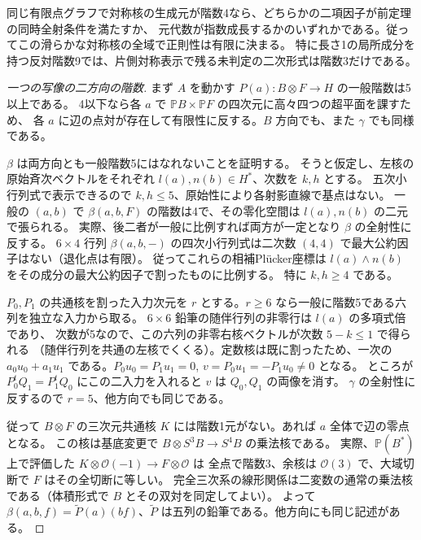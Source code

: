 \begin{theorem}\label{thm:smooth-symmetric-kernel-all}
同じ有限点グラフで対称核の生成元が階数4なら、どちらかの二項因子が前定理の同時全射条件を満たすか、
元代数が指数成長するかのいずれかである。従ってこの滑らかな対称核の全域で正則性は有限に決まる。
特に長さ1の局所成分を持つ反対階数9では、片側対称表示で残る未判定の二次形式は階数3だけである。
\end{theorem}
\begin{proof}[一つの写像の二方向の階数]
まず $A$ を動かす $P(a):B\otimes F\to H$ の一般階数は5以上である。
4以下なら各 $a$ で $\mathbb P B\times\mathbb P F$ の四次元に高々四つの超平面を課すため、
各 $a$ に辺の点対が存在して有限性に反する。$B$ 方向でも、また $\gamma$ でも同様である。

$\beta$ は両方向とも一般階数5にはなれないことを証明する。
そうと仮定し、左核の原始斉次ベクトルをそれぞれ $l(a),n(b)\in H^*$、次数を $k,h$ とする。
五次小行列式で表示できるので $k,h\le5$、原始性により各射影直線で基点はない。
一般の $(a,b)$ で $\beta(a,b,F)$ の階数は4で、その零化空間は $l(a),n(b)$ の二元で張られる。
実際、後二者が一般に比例すれば両方が一定となり $\beta$ の全射性に反する。
$6\times4$ 行列 $\beta(a,b,-)$ の四次小行列式は二次数 $(4,4)$ で最大公約因子はない（退化点は有限）。
従ってこれらの相補Plücker座標は $l(a)\wedge n(b)$ をその成分の最大公約因子で割ったものに比例する。
特に $k,h\ge4$ である。

$P_0,P_1$ の共通核を割った入力次元を $r$ とする。$r\ge6$ なら一般に階数5である六列を独立な入力から取る。
$6\times6$ 鉛筆の随伴行列の非零行は $l(a)$ の多項式倍であり、
次数が5なので、この六列の非零右核ベクトルが次数 $5-k\le1$ で得られる
（随伴行列を共通の左核でくくる）。定数核は既に割ったため、一次の
$a_0u_0+a_1u_1$ である。$P_0u_0=P_1u_1=0$, $v=P_0u_1=-P_1u_0\ne0$ となる。
ところが $P_0^t Q_1=P_1^tQ_0$ にこの二入力を入れると $v$ は $Q_0,Q_1$ の両像を消す。
$\gamma$ の全射性に反するので $r=5$、他方向でも同じである。

従って $B\otimes F$ の三次元共通核 $K$ には階数1元がない。あれば $a$ 全体で辺の零点となる。
この核は基底変更で $B\otimes S^3 B\to S^4 B$ の乗法核である。
実際、$\mathbb P(B^*)$ 上で評価した $K\otimes\mathcal O(-1)\to F\otimes\mathcal O$ は
全点で階数3、余核は $\mathcal O(3)$ で、大域切断で $F$ はその全切断に等しい。
完全三次系の線形関係は二変数の通常の乗法核である（体積形式で $B$ とその双対を同定してよい）。
よって $\beta(a,b,f)=\widetilde P(a)(bf)$、$\widetilde P$ は五列の鉛筆である。他方向にも同じ記述がある。


\end{proof}
